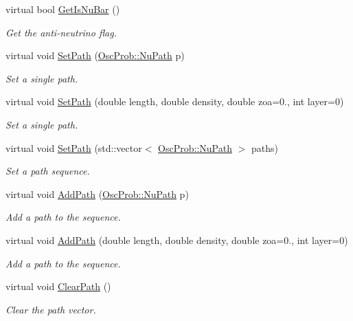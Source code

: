 \begin{DoxyCompactItemize}
virtual bool \hyperlink{classOscProb_1_1PMNS__Base_a2f7f2a028dfe7a90fff6b4f757972c2c}{Get\+Is\+Nu\+Bar} ()
\begin{DoxyCompactList}\small\item\em Get the anti-\/neutrino flag. \end{DoxyCompactList}\item 
virtual void \hyperlink{classOscProb_1_1PMNS__Base_ac3b644fd0a56347d304ceca4ae9d8875}{Set\+Path} (\hyperlink{structOscProb_1_1NuPath}{Osc\+Prob\+::\+Nu\+Path} p)
\begin{DoxyCompactList}\small\item\em Set a single path. \end{DoxyCompactList}\item 
virtual void \hyperlink{classOscProb_1_1PMNS__Base_a35b983270613072a3df58b574d80dbfd}{Set\+Path} (double length, double density, double zoa=0., int layer=0)
\begin{DoxyCompactList}\small\item\em Set a single path. \end{DoxyCompactList}\item 
virtual void \hyperlink{classOscProb_1_1PMNS__Base_a637d19dd850b4246507796526622643c}{Set\+Path} (std\+::vector$<$ \hyperlink{structOscProb_1_1NuPath}{Osc\+Prob\+::\+Nu\+Path} $>$ paths)
\begin{DoxyCompactList}\small\item\em Set a path sequence. \end{DoxyCompactList}\item 
virtual void \hyperlink{classOscProb_1_1PMNS__Base_a887dc9d4dc569ec0cdef3933b4c60efc}{Add\+Path} (\hyperlink{structOscProb_1_1NuPath}{Osc\+Prob\+::\+Nu\+Path} p)
\begin{DoxyCompactList}\small\item\em Add a path to the sequence. \end{DoxyCompactList}\item 
virtual void \hyperlink{classOscProb_1_1PMNS__Base_ab7f89ad9e7e1224adaa59d3c41594cd9}{Add\+Path} (double length, double density, double zoa=0., int layer=0)
\begin{DoxyCompactList}\small\item\em Add a path to the sequence. \end{DoxyCompactList}\item 
virtual void \hyperlink{classOscProb_1_1PMNS__Base_aefe521239031c418cfaaaa550a6e13bb}{Clear\+Path} ()
\begin{DoxyCompactList}\small\item\em Clear the path vector. \end{DoxyCompactList}\item 

\end{DoxyCompactItemize}
